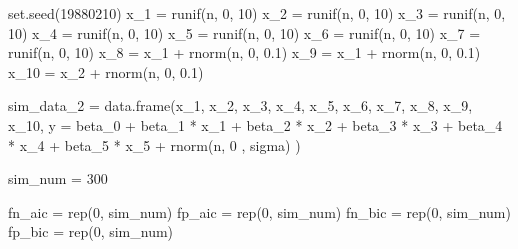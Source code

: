 \documentclass[
]{article}
\newenvironment{Shaded}{\begin{snugshade}}{\end{snugshade}}
\newcommand{\AttributeTok}[1]{\textcolor[rgb]{0.77,0.63,0.00}{#1}}
\newcommand{\DecValTok}[1]{\textcolor[rgb]{0.00,0.00,0.81}{#1}}
\newcommand{\FloatTok}[1]{\textcolor[rgb]{0.00,0.00,0.81}{#1}}
\newcommand{\FunctionTok}[1]{\textcolor[rgb]{0.00,0.00,0.00}{#1}}
\newcommand{\NormalTok}[1]{#1}
\newcommand{\OtherTok}[1]{\textcolor[rgb]{0.56,0.35,0.01}{#1}}
\newcommand{\SpecialCharTok}[1]{\textcolor[rgb]{0.00,0.00,0.00}{#1}}
\begin{document}
\begin{Shaded}
\begin{Highlighting}[]
\FunctionTok{set.seed}\NormalTok{(}\DecValTok{19880210}\NormalTok{)}
\NormalTok{x\_1  }\OtherTok{=} \FunctionTok{runif}\NormalTok{(n, }\DecValTok{0}\NormalTok{, }\DecValTok{10}\NormalTok{)}
\NormalTok{x\_2  }\OtherTok{=} \FunctionTok{runif}\NormalTok{(n, }\DecValTok{0}\NormalTok{, }\DecValTok{10}\NormalTok{)}
\NormalTok{x\_3  }\OtherTok{=} \FunctionTok{runif}\NormalTok{(n, }\DecValTok{0}\NormalTok{, }\DecValTok{10}\NormalTok{)}
\NormalTok{x\_4  }\OtherTok{=} \FunctionTok{runif}\NormalTok{(n, }\DecValTok{0}\NormalTok{, }\DecValTok{10}\NormalTok{)}
\NormalTok{x\_5  }\OtherTok{=} \FunctionTok{runif}\NormalTok{(n, }\DecValTok{0}\NormalTok{, }\DecValTok{10}\NormalTok{)}
\NormalTok{x\_6  }\OtherTok{=} \FunctionTok{runif}\NormalTok{(n, }\DecValTok{0}\NormalTok{, }\DecValTok{10}\NormalTok{)}
\NormalTok{x\_7  }\OtherTok{=} \FunctionTok{runif}\NormalTok{(n, }\DecValTok{0}\NormalTok{, }\DecValTok{10}\NormalTok{)}
\NormalTok{x\_8  }\OtherTok{=}\NormalTok{ x\_1 }\SpecialCharTok{+} \FunctionTok{rnorm}\NormalTok{(n, }\DecValTok{0}\NormalTok{, }\FloatTok{0.1}\NormalTok{)}
\NormalTok{x\_9  }\OtherTok{=}\NormalTok{ x\_1 }\SpecialCharTok{+} \FunctionTok{rnorm}\NormalTok{(n, }\DecValTok{0}\NormalTok{, }\FloatTok{0.1}\NormalTok{)}
\NormalTok{x\_10 }\OtherTok{=}\NormalTok{ x\_2 }\SpecialCharTok{+} \FunctionTok{rnorm}\NormalTok{(n, }\DecValTok{0}\NormalTok{, }\FloatTok{0.1}\NormalTok{)}

\NormalTok{sim\_data\_2 }\OtherTok{=} \FunctionTok{data.frame}\NormalTok{(x\_1, x\_2, x\_3, x\_4, x\_5, x\_6, x\_7, x\_8, x\_9, x\_10,}
  \AttributeTok{y =}\NormalTok{ beta\_0 }\SpecialCharTok{+}\NormalTok{ beta\_1 }\SpecialCharTok{*}\NormalTok{ x\_1 }\SpecialCharTok{+}\NormalTok{ beta\_2 }\SpecialCharTok{*}\NormalTok{ x\_2 }\SpecialCharTok{+}\NormalTok{ beta\_3 }\SpecialCharTok{*}\NormalTok{ x\_3 }\SpecialCharTok{+}\NormalTok{ beta\_4 }\SpecialCharTok{*}\NormalTok{ x\_4 }\SpecialCharTok{+} 
\NormalTok{      beta\_5 }\SpecialCharTok{*}\NormalTok{ x\_5 }\SpecialCharTok{+} \FunctionTok{rnorm}\NormalTok{(n, }\DecValTok{0}\NormalTok{ , sigma)}
\NormalTok{)}


\NormalTok{sim\_num }\OtherTok{=} \DecValTok{300}

\NormalTok{fn\_aic }\OtherTok{=} \FunctionTok{rep}\NormalTok{(}\DecValTok{0}\NormalTok{, sim\_num)}
\NormalTok{fp\_aic }\OtherTok{=} \FunctionTok{rep}\NormalTok{(}\DecValTok{0}\NormalTok{, sim\_num)}
\NormalTok{fn\_bic }\OtherTok{=} \FunctionTok{rep}\NormalTok{(}\DecValTok{0}\NormalTok{, sim\_num)}
\NormalTok{fp\_bic }\OtherTok{=} \FunctionTok{rep}\NormalTok{(}\DecValTok{0}\NormalTok{, sim\_num)}


\end{Highlighting}
\end{Shaded}
\end{document}
